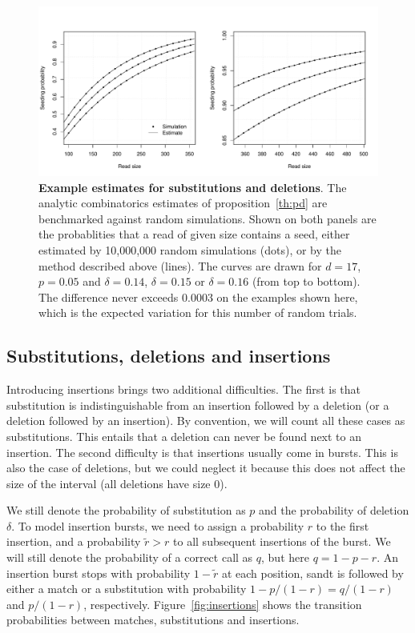 \documentclass{article}
\begin{document}
\begin{figure}[h]
\centering
\includegraphics[scale=0.445]{simulpdel.pdf}
\caption{\textbf{Example estimates for substitutions and deletions}. The
analytic combinatorics estimates of proposition~\ref{th:pd} are
benchmarked against random simulations. Shown on both panels are the
probablities that a read of given size contains a seed, either estimated
by 10,000,000 random simulations (dots), or by the method described above
(lines). The curves are drawn for $d=17$, $p=0.05$ and $\delta=0.14$,
$\delta=0.15$ or $\delta=0.16$ (from top to bottom). The difference never
exceeds 0.0003 on the examples shown here, which is the expected variation
for this number of random trials.}
\label{fig:simulpdel}
\end{figure}





\subsection{Substitutions, deletions and insertions}
\label{subsec:sdi}

Introducing insertions brings two additional difficulties. The first is
that substitution is indistinguishable from an insertion followed by a
deletion (or a deletion followed by an insertion). By convention, we will
count all these cases as substitutions. This entails that a deletion can
never be found next to an insertion. The second difficulty is that
insertions usually come in bursts. This is also the case of deletions, but
we could neglect it because this does not affect the size of the interval
(all deletions have size $0$). 

We still denote the probability of substitution as $p$ and the probability
of deletion $\delta$. To model insertion bursts, we need to assign a
probability $r$ to the first insertion, and a probability $\tilde{r} > r$
to all subsequent insertions of the burst. We will still denote the
probability of a correct call as $q$, but here $q = 1-p-r$.  An insertion
burst stops with probability $1-\tilde{r}$ at each position, sandt is
followed by either a match or a substitution with probability $1-p/(1-r) =
q/(1-r)$ and $p/(1-r)$, respectively. Figure~\ref{fig:insertions} shows
the transition probabilities between matches, substitutions and
insertions.
\end{document}
